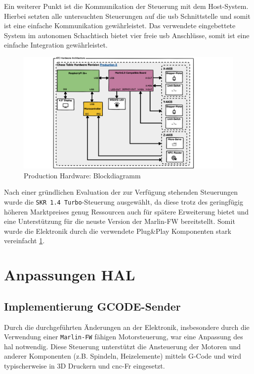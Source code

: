 Ein weiterer Punkt ist die Kommunikation der Steuerung mit dem
Host-System. Hierbei setzten alle untersuchten Steuerungen auf die
\gls{usb} Schnittstelle und somit ist eine einfache Kommunikation
gewährleistet. Das verwendete eingebettete System im autonomen
Schachtisch bietet vier freie \gls{usb} Anschlüsse, somit ist eine
einfache Integration gewährleistet.

\begin{figure}
\centering
\includegraphics{images/ATC_Hardware_Architecture_PROD.png}
\caption{Production Hardware: Blockdiagramm
\label{ATC_Hardware_Architecture_PROD}}
\end{figure}

Nach einer gründlichen Evaluation der zur Verfügung stehenden
Steuerungen wurde die \passthrough{\lstinline!SKR 1.4 Turbo!}-Steuerung
ausgewählt, da diese trotz des geringfügig höheren Marktpreises genug
Ressourcen auch für spätere Erweiterung bietet und eine Unterstützung
für die neuste Version der Marlin-FW\cite{marlinfw} bereitstellt.
Somit wurde die Elektronik durch die verwendete Plug\&Play Komponenten
stark vereinfacht \ref{ATC_Hardware_Architecture_PROD}.

\hypertarget{anpassungen-hal}{%
\section{Anpassungen HAL}\label{anpassungen-hal}}

\hypertarget{implementierung-gcode-sender}{%
\subsection{Implementierung
GCODE-Sender}\label{implementierung-gcode-sender}}

Durch die durchgeführten Änderungen an der Elektronik, insbesondere
durch die Verwendung einer
\passthrough{\lstinline!Marlin-FW!}\cite{marlinfw} fähigen
Motorsteuerung, war eine Anpassung des \gls{hal} notwendig. Diese
Steuerung unterstützt die Ansteuerung der Motoren und anderer
Komponenten (z.B. Spindeln, Heizelemente) mittels G-Code und wird
typischerweise in 3D Druckern und \gls{cnc}-Fr eingesetzt.

